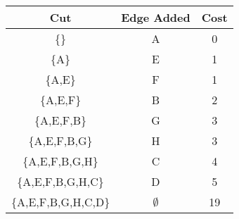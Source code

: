 \documentclass[11pt,letterpaper]{article}
\begin{document}
\begin{center}
\begin{tabular} { |c|c|c| }
\hline
Cut & Edge Added & Cost \\
\hline
\{\} & A & 0 \\ 
\hline
\{A\} & E & 1 \\
\hline
\{A,E\} & F & 1 \\
\hline
\{A,E,F\} & B & 2 \\
\hline
\{A,E,F,B\} & G & 3 \\
\hline
\{A,E,F,B,G\} & H & 3 \\
\hline
\{A,E,F,B,G,H\} & C & 4 \\
\hline
\{A,E,F,B,G,H,C\} & D & 5 \\
\hline
\{A,E,F,B,G,H,C,D\} & $\emptyset$ & 19 \\
\hline
\end{tabular}
\end{center}

\pagebreak

\end{document}
